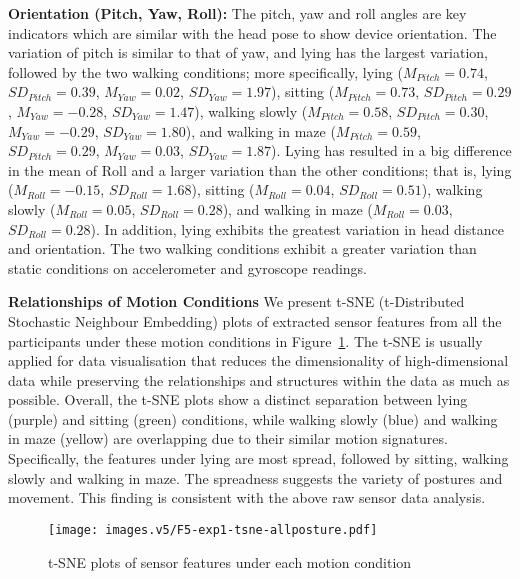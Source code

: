 \noindent\textbf{Orientation (Pitch, Yaw, Roll):}  The pitch, yaw and roll angles are key indicators which are similar with the head pose to show device orientation. The variation of pitch is similar to that of yaw, and lying has the largest variation, followed by the two walking conditions; more specifically, lying ($M_{Pitch} = 0.74$, $SD_{Pitch} = 0.39$, $M_{Yaw} = 0.02$, $SD_{Yaw} = 1.97$), sitting ($M_{Pitch} = 0.73$, $SD_{Pitch} = 0.29$, $M_{Yaw} = -0.28$, $SD_{Yaw} = 1.47$), walking slowly ($M_{Pitch} = 0.58$, $SD_{Pitch} = 0.30$, $M_{Yaw} = -0.29$, $SD_{Yaw} = 1.80$), and walking in maze ($M_{Pitch} = 0.59$, $SD_{Pitch} = 0.29$, $M_{Yaw} = 0.03$, $SD_{Yaw} = 1.87$). Lying has resulted in a big difference in the mean of Roll and a larger variation than the other conditions; that is, lying ($M_{Roll} =  -0.15$, $SD_{Roll} = 1.68$), sitting ($M_{Roll} = 0.04$, $SD_{Roll} = 0.51$), walking slowly ($M_{Roll} = 0.05$, $SD_{Roll} = 0.28$), and walking in maze ($M_{Roll} = 0.03$, $SD_{Roll} = 0.28$). In addition, lying exhibits the greatest variation in head distance and orientation. The two walking conditions exhibit a greater variation than static conditions on accelerometer and gyroscope readings.


\noindent\textbf{Relationships of Motion Conditions} We present t-SNE (t-Distributed Stochastic Neighbour Embedding) plots of extracted sensor features from all the participants under these motion conditions in Figure~\ref{fig:us1tsneallposture}. The t-SNE is usually applied for data visualisation that reduces the dimensionality of high-dimensional data while preserving the relationships and structures within the data as much as possible. Overall, the t-SNE plots show a distinct separation between lying (purple) and sitting (green) conditions, while walking slowly (blue) and walking in maze (yellow) are overlapping due to their similar motion signatures. Specifically, the features under lying are most spread, followed by sitting, walking slowly and walking in maze. The spreadness suggests the variety of postures and movement. This finding is consistent with the above raw sensor data analysis. 


\begin{figure}[!htbp]
\centering
\texttt{[image: images.v5/F5-exp1-tsne-allposture.pdf]}
\caption{t-SNE plots of sensor features under each motion condition}
\label{fig:us1tsneallposture}
\end{figure}


